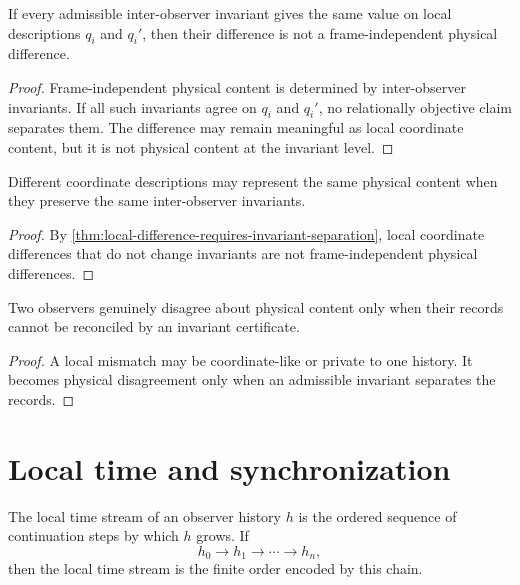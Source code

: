 \begin{theorem}
\label{thm:local-difference-requires-invariant-separation}
If every admissible inter-observer invariant gives the same value on local descriptions $q_i$ and $q_i'$, then their difference is not a frame-independent physical difference.
\end{theorem}

\begin{proof}
Frame-independent physical content is determined by inter-observer invariants. If all such invariants agree on $q_i$ and $q_i'$, no relationally objective claim separates them. The difference may remain meaningful as local coordinate content, but it is not physical content at the invariant level.
\end{proof}

\begin{corollary}
\label{cor:coordinate-freedom-not-empirical-ambiguity}
Different coordinate descriptions may represent the same physical content when they preserve the same inter-observer invariants.
\end{corollary}

\begin{proof}
By \autoref{thm:local-difference-requires-invariant-separation}, local coordinate differences that do not change invariants are not frame-independent physical differences.
\end{proof}

\begin{corollary}
\label{cor:empirical-disagreement-requires-invariant-separation}
Two observers genuinely disagree about physical content only when their records cannot be reconciled by an invariant certificate.
\end{corollary}

\begin{proof}
A local mismatch may be coordinate-like or private to one history. It becomes physical disagreement only when an admissible invariant separates the records.
\end{proof}

\section{Local time and synchronization}
\label{sec:local-time-and-synchronization}

\begin{definition}
\label{def:reality-local-time-stream}
The local time stream of an observer history $h$ is the ordered sequence of continuation steps by which $h$ grows. If
$$
h_0\to h_1\to\cdots\to h_n,
$$
then the local time stream is the finite order encoded by this chain.
\end{definition}

